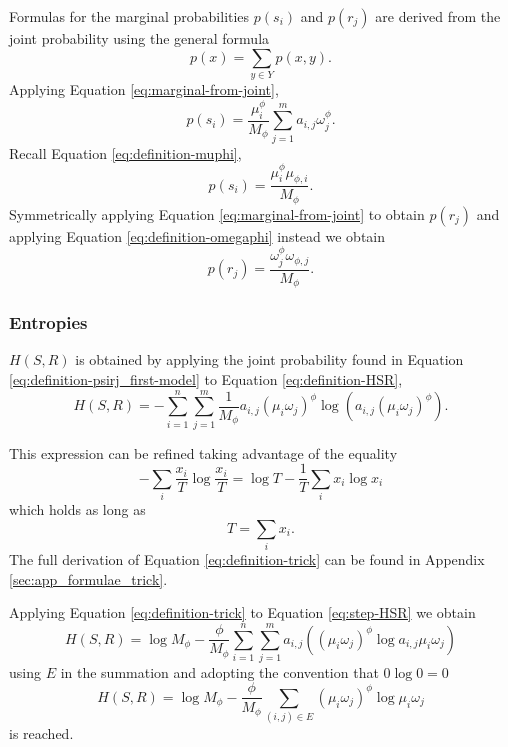 Formulas for the marginal probabilities $p(s_i)$ and $p(r_j)$ are derived from the joint probability using the general formula
\begin{equation}
  \label{eq:marginal-from-joint}
  p(x) = \sum_{y \in Y} p(x,y).
\end{equation}
Applying Equation \eqref{eq:marginal-from-joint},
\begin{equation*}
  p(s_i) = \frac{\mu_i^\phi}{M_\phi} \sum_{j=1}^m a_{i,j} \omega_j^\phi.
\end{equation*}
Recall Equation \eqref{eq:definition-muphi},
\begin{equation}
  \label{eq:definition-psi_first-model}
  p(s_i) = \frac{\mu_i^\phi \mu_{\phi,i}}{M_\phi}.
\end{equation}
Symmetrically applying Equation \eqref{eq:marginal-from-joint} to obtain $p(r_j)$ and applying Equation \eqref{eq:definition-omegaphi} instead we obtain
\begin{equation}
  \label{eq:definition-prj_first-model}
  p(r_j) = \frac{\omega_j^\phi \omega_{\phi,j}}{M_\phi}.
\end{equation}

\subsubsection{Entropies}

$H(S,R)$ is obtained by applying the joint probability found in Equation \eqref{eq:definition-psirj_first-model} to Equation \eqref{eq:definition-HSR},
\begin{equation}
  \label{eq:step-HSR}
  H(S,R) = -\sum_{i=1}^n \sum_{j=1}^m \frac{1}{M_\phi} a_{i,j} (\mu_i \omega_j)^\phi \log \left( a_{i,j} (\mu_i \omega_j)^\phi \right).
\end{equation}

This expression can be refined taking advantage of the equality
\begin{equation}
  \label{eq:definition-trick}
  -\sum_i \frac{x_i}{T} \log\frac{x_i}{T} = \log T - \frac{1}{T} \sum_i x_i \log x_i
\end{equation}
which holds as long as
\begin{equation*}
  T = \sum_i x_i.
\end{equation*}
The full derivation of Equation \eqref{eq:definition-trick} can be found in Appendix \ref{sec:app_formulae_trick}.

Applying Equation \eqref{eq:definition-trick} to Equation \eqref{eq:step-HSR} we obtain
\begin{equation*}
  H(S,R) = \log M_\phi - \frac{\phi}{M_\phi} \sum_{i=1}^n \sum_{j=1}^m a_{i,j} \left( (\mu_i \omega_j)^\phi \log a_{i,j} \mu_i \omega_j \right)
\end{equation*}
using $E$ in the summation and adopting the convention that $0 \log 0 = 0$
\begin{equation}
  \label{eq:definition-HSR_first-model}
  H(S,R) = \log M_\phi - \frac{\phi}{M_\phi} \sum_{(i,j) \in E} (\mu_i \omega_j)^\phi \log \mu_i \omega_j
\end{equation}
is reached.


